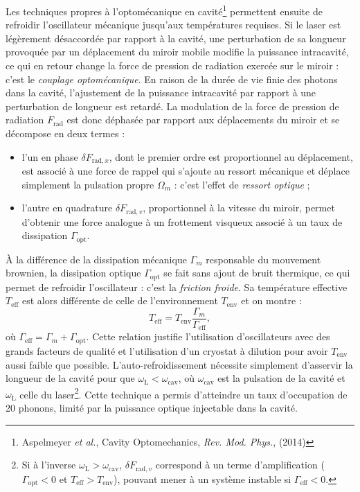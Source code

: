 \documentclass[12pt,a4paper]{article}
\begin{document}
Les techniques propres à l'optomécanique en cavité\footnote{Aspelmeyer \textit{et al.}, Cavity Optomechanics, \textit{Rev. Mod. Phys.}, (2014)} permettent ensuite de refroidir l'oscillateur mécanique jusqu'aux températures requises.
Si le laser est légèrement désaccordée par rapport à la cavité, une perturbation de sa longueur provoquée par un déplacement du miroir mobile modifie la puissance intracavité, ce qui en retour change la force de pression de radiation exercée sur le miroir : c'est le \textit{couplage optomécanique}. 
En raison de la durée de vie finie des photons dans la cavité, l'ajustement de la puissance intracavité par rapport à une perturbation de longueur est retardé.
La modulation de la force de pression de radiation $F_\mathrm{rad}$ est donc déphasée par rapport aux déplacements du miroir et se décompose en deux termes :
\begin{itemize}
\item l'un en phase $\delta F_{\mathrm{rad}, x}$, dont le premier ordre est proportionnel au déplacement, est associé à une force de rappel qui s'ajoute au ressort mécanique et déplace simplement la pulsation propre $\Omega_m$ : c'est l'effet de \textit{ressort optique} ;
\item l'autre en quadrature $\delta F_{\mathrm{rad}, v}$, proportionnel à la vitesse du miroir, permet d'obtenir une force analogue à un frottement visqueux associé à un taux de dissipation $\Gamma_\mathrm{opt}$.
\end{itemize}
À la différence de la dissipation mécanique $\Gamma_m$ responsable du mouvement brownien, la dissipation optique $\Gamma_\mathrm{opt}$ se fait sans ajout de bruit thermique, ce qui permet de refroidir l'oscillateur : c'est la \textit{friction froide}.
Sa température effective $T_\mathrm{eff}$ est alors différente de celle de l'environnement $T_\mathrm{env}$ et on montre :
\begin{equation}
T_\mathrm{eff} = T_\mathrm{env} \frac{\Gamma_m}{\Gamma_\mathrm{eff}},
\end{equation}
où $\Gamma_\mathrm{eff} = \Gamma_m+\Gamma_\mathrm{opt}$.
Cette relation justifie l'utilisation d'oscillateurs avec des grands facteurs de qualité et l'utilisation d'un cryostat à dilution pour avoir $T_\mathrm{env}$ aussi faible que possible.
L'auto-refroidissement nécessite \og simplement \fg{} d'asservir la longueur de la cavité pour que $\omega_\mathrm{L} < \omega_\mathrm{cav}$, où $\omega_\mathrm{cav}$ est la pulsation de la cavité et $\omega_\mathrm{L}$ celle du laser\footnote{Si à l'inverse $\omega_\mathrm{L} > \omega_\mathrm{cav}$, $\delta F_{\mathrm{rad}, v}$ correspond à un terme d'amplification ($\Gamma_\mathrm{opt} < 0 $ et $T_\mathrm{eff} > T_\mathrm{env}$), pouvant mener à un système instable si $\Gamma_\mathrm{eff} < 0$.}.
Cette technique a permis d'atteindre un taux d'occupation de 20 phonons, limité par la puissance optique injectable dans la cavité.
\end{document}
